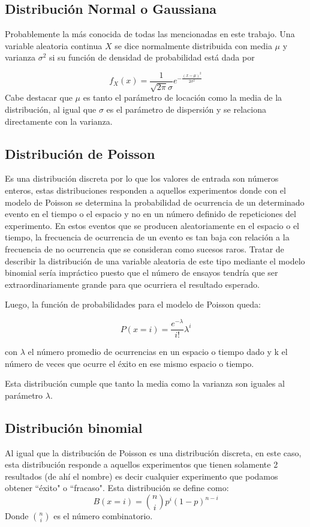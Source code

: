 \documentclass[baaa]{baaa}
\begin{document}
\subsection{Distribución Normal o Gaussiana}
Probablemente la más conocida de todas las mencionadas en este trabajo. Una variable aleatoria continua  $X$  se dice normalmente distribuida con media $\mu$  y varianza $\sigma^2$  si su función de densidad de probabilidad está dada por

\begin{equation}
f_X(x) = \frac{1}{\sqrt{2\pi}\sigma} e^{-\frac{(x - \mu)^2}{2\sigma^2}} 
\end{equation}
Cabe destacar que $\mu$ es tanto el parámetro de locación como la media de la distribución, al igual que $\sigma$ es el parámetro de dispersión y se relaciona directamente con la varianza.

\subsection{Distribución de Poisson}
Es una distribución discreta por lo que los valores de entrada son números enteros, estas distribuciones responden a aquellos experimentos donde 
con el modelo de Poisson se determina la probabilidad de ocurrencia de un determinado evento en el tiempo o el espacio y no en un número definido de repeticiones del experimento. En estos eventos que se producen aleatoriamente en el espacio o el tiempo, la frecuencia de ocurrencia de un evento es tan baja con relación a la frecuencia de no ocurrencia que se consideran como sucesos raros. Tratar de describir la distribución de una variable aleatoria de este tipo mediante el modelo binomial sería impráctico puesto que el número de ensayos tendría que ser extraordinariamente grande para que ocurriera el resultado esperado.

Luego, la función de probabilidades para el modelo de Poisson queda:

\begin{equation}
    P(x=i)= \frac{e^{- \lambda}}{i!}\lambda ^i 
\end{equation}

con $\lambda$ el número promedio de ocurrencias en un espacio o tiempo dado y k el número de veces que ocurre el éxito en ese mismo espacio o tiempo.


Esta distribución cumple que tanto la media como la varianza son iguales al parámetro $\lambda$.

\subsection{Distribución binomial}
Al igual que la distribución de Poisson es una distribución discreta, en este caso, esta distribución responde a aquellos experimentos que tienen solamente 2 resultados (de ahí el nombre) es decir cualquier experimento que podamos obtener ``éxito" o ``fracaso". Esta distribución se define como: 
\begin{equation}
    B(x=i)= \binom{n}{i}p^i(1-p)^{n-i}
\end{equation}
Donde $\binom{n}{i}$ es el número combinatorio.
\end{document}
